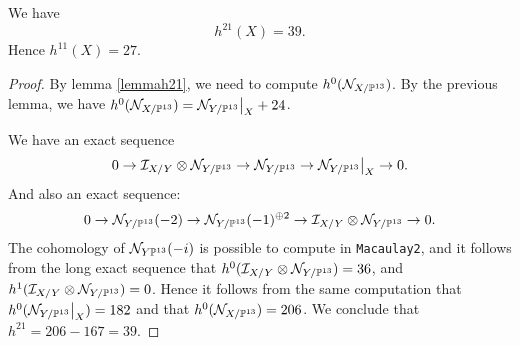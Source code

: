 \documentclass[11pt, english]{article}
\begin{document}
\begin{prop}
 We have 
\[
h^{21}(X) = 39.
\]
Hence $h^{11}(X)=27$.
\end{prop}
\begin{proof}
By lemma \ref{lemmah21}, we need to compute $h^0(\mathcal N_{X/\mathbb{P}^{13}})$. By the previous lemma, we have $h^0(\mathcal N_{X/\PP^{13}})=\restr{\mathcal N_{Y/\PP^{13}}}{X}+24$. 

We have an exact sequence
\[
0 \to \mathcal I_{X/Y} \otimes \mathcal N_{Y/\PP^{13}} \to  \mathcal N_{Y/\PP^{13}} \to \restr{\mathcal N_{Y/\PP^{13}}}{X} \to 0.
\]
And also an exact sequence:
\[
0 \to \mathcal N_{Y/\mathbb{P}^{13}}(-2) \to \mathcal N_{Y/\mathbb{P}^{13}}(-1)^{\oplus 2} \to \mathcal I_{X/Y} \otimes \mathcal N_{Y/\mathbb{P}^{13}} \to 0.
\]
The cohomology of $\mathcal N_{Y\mathbb{P}^{13}}(-i)$ is possible to compute in \verb|Macaulay2|, and it follows from the long exact sequence that $h^0(\mathcal I_{X/Y} \otimes \mathcal N_{Y/\mathbb{P}^{13}})=36$, and $h^1(\mathcal I_{X/Y} \otimes \mathcal N_{Y/\mathbb{P}^{13}})=0$. Hence it follows from the same computation that $h^0(\restr{\mathcal N_{Y/\PP^{13}}}{X})=182$ and that $h^0(\mathcal N_{X/\mathbb{P}^{13}})=206$. We conclude that $h^{21}=206-167=39$.
\end{proof}

 

\end{document}
